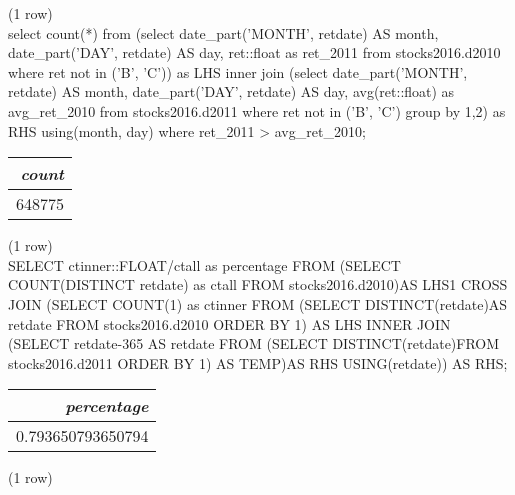 \noindent (1 row) \\

select count(*)
from
(select date_part('MONTH', retdate) AS month, date_part('DAY', retdate) AS day, ret::float as ret_2011
from stocks2016.d2010
where ret not in ('B', 'C')) as LHS 
inner join
(select date_part('MONTH', retdate) AS month, date_part('DAY', retdate) AS day, avg(ret::float) as avg_ret_2010
from stocks2016.d2011
where ret not in ('B', 'C')
group by 1,2) as RHS
using(month, day)
where ret_2011 > avg_ret_2010;
\begin{tabular}{r}
\textit{count} \\
\hline
648775 \\
\end{tabular}

\noindent (1 row) \\

SELECT ctinner::FLOAT/ctall as percentage FROM
(SELECT COUNT(DISTINCT retdate) as ctall FROM stocks2016.d2010)AS LHS1
CROSS JOIN
 (SELECT COUNT(1) as ctinner FROM
(SELECT DISTINCT(retdate)AS retdate FROM stocks2016.d2010 ORDER BY 1) AS LHS
INNER JOIN
 (SELECT retdate-365 AS retdate FROM
   (SELECT DISTINCT(retdate)FROM stocks2016.d2011 ORDER BY 1) AS TEMP)AS RHS
USING(retdate)) AS RHS;
\begin{tabular}{r}
\textit{percentage} \\
\hline
0.793650793650794 \\
\end{tabular}

\noindent (1 row) \\

